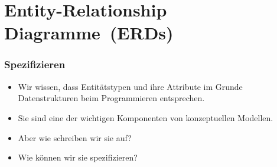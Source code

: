 \documentclass[aspectratio=169,mathserif,notheorems]{beamer}%
\begin{document}
\section{Entity-Relationship Diagramme~(ERDs)}%
%
\begin{frame}%
\frametitle{Spezifizieren}%
\begin{itemize}%
\item Wir wissen, dass Entitätstypen und ihre Attribute im Grunde Datenstrukturen beim Programmieren entsprechen.%
%
\item<2-> Sie sind eine der wichtigen Komponenten von konzeptuellen Modellen.%
%
\item<3-> Aber wie schreiben wir sie auf?%
%
\item<4-> Wie können wir sie spezifizieren?%
%
\end{itemize}%
\end{frame}%
%
\end{document}
